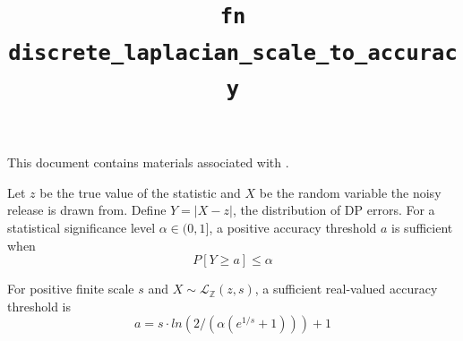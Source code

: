 \documentclass{article}
\title{\texttt{fn discrete\_laplacian\_scale\_to\_accuracy}}
\author{\MichaelShoemateAuthor}
\begin{document}
\maketitle
\contrib

This document contains materials associated with .

\begin{definition}
    Let $z$ be the true value of the statistic and $X$ be the random variable the noisy release is drawn from.
    Define $Y = |X - z|$, the distribution of DP errors.
    For a statistical significance level $\alpha\in(0,1]$, a positive accuracy threshold $a$ is sufficient when
    \begin{equation}
        P[Y \ge a]\leq\alpha
    \end{equation}
\end{definition}

\begin{theorem}
    For positive finite scale $s$ and $X\sim\mathcal{L}_\mathbb{Z}(z,s)$, a sufficient real-valued accuracy threshold is
    \begin{equation}
        a = s \cdot ln(2 / (\alpha (e^{1/s} + 1))) + 1
    \end{equation}
\end{theorem}
\end{document}
